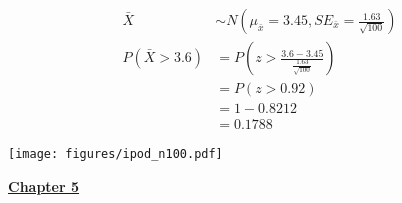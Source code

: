 \documentclass[11pt]{article}
\begin{document}
\begin{enumerate}
\begin{enumerate}[(a)]
\begin{minipage}[c]{0.5\textwidth}
\begin{align*}
\bar{X} &\sim N\left(\mu_{\bar{x}} = 3.45, SE_{\bar{x}} = \frac{1.63}{\sqrt{100}}\right) \\
P(\bar{X} > 3.6 ) &= P\left(z > \frac{3.6 - 3.45}{\frac{1.63}{\sqrt{100}}}\right) \\
&= P(z > 0.92) \\
&= 1 - 0.8212 \\
&=  0.1788
\end{align*}
\end{minipage}
\begin{minipage}[c]{0.5\textwidth}
\begin{center}
\texttt{[image: figures/ipod\_n100.pdf]}
\end{center}
\end{minipage}
\end{enumerate}
\end{enumerate}
%

\pagebreak

{\large \textbf{\underline{Chapter 5}}}
\end{document}

